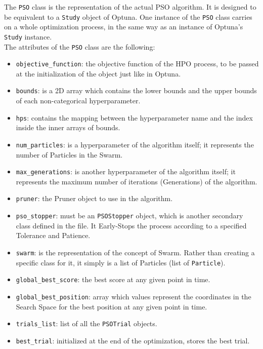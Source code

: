 The \texttt{PSO} class is the representation of the actual PSO algorithm. It is designed to be equivalent to a \texttt{Study} object of Optuna.
One instance of the \texttt{PSO} class carries on a whole optimization process, in the same way as an instance of Optuna's \texttt{Study} instance.
% 
\\[0.3cm]The attributes of the \texttt{PSO} class are the following:
\begin{itemize}[itemsep=0.1cm]
    \item \texttt{objective\_function}: the objective function of the HPO process, to be passed at the initialization of the object just like in Optuna.
    \item \texttt{bounds}: is a 2D array which contains the lower bounds and the upper bounds of each non-categorical hyperparameter.
    \item \texttt{hps}: contains the mapping between the hyperparameter name and the index inside the inner arrays of bounds.
    \item \texttt{num\_particles}: is a hyperparameter of the algorithm itself; it represents the number of Particles in the Swarm.
    \item \texttt{max\_generations}: is another hyperparameter of the algorithm itself; it represents the maximum number of iterations (Generations) of the algorithm.
    \item \texttt{pruner}: the Pruner object to use in the algorithm.
    \item \texttt{pso\_stopper}: must be an \texttt{PSOStopper} object, which is another secondary class defined in the file. It Early-Stops the process according to a specified Tolerance and Patience.
    \item \texttt{swarm}: is the representation of the concept of Swarm. Rather than creating a specific class for it, it simply is a list of Particles (list of \texttt{Particle}).
    \item \texttt{global\_best\_score}: the best score at any given point in time.
    \item \texttt{global\_best\_position}: array which values represent the coordinates in the Search Space for the best position at any given point in time.
    \item \texttt{trials\_list}: list of all the \texttt{PSOTrial} objects.
    \item \texttt{best\_trial}: initialized at the end of the optimization, stores the best trial.
\end{itemize}
